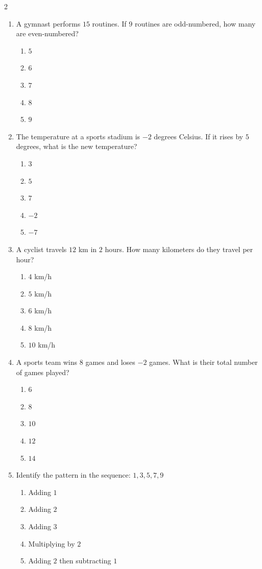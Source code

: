 \documentclass[10pt]{article}
\begin{document}
\begin{multicols}{2}
\begin{enumerate}[label=\textbf{Q\arabic*.}, leftmargin=*, itemsep=6pt, parsep=0pt]
  \item \small A gymnast performs $15$ routines. If $9$ routines are odd-numbered, how many are even-numbered?
  \begin{enumerate}[label=(\Alph*), leftmargin=0.6cm, nosep, itemsep=2pt]
    \item $5$
    \item $6$
    \item $7$
    \item $8$
    \item $9$
  \end{enumerate}

  \item \small The temperature at a sports stadium is $-2$ degrees Celsius. If it rises by $5$ degrees, what is the new temperature?
  \begin{enumerate}[label=(\Alph*), leftmargin=0.6cm, nosep, itemsep=2pt]
    \item $3$
    \item $5$
    \item $7$
    \item $-2$
    \item $-7$
  \end{enumerate}

  \item \small A cyclist travels $12$ km in $2$ hours. How many kilometers do they travel per hour?
  \begin{enumerate}[label=(\Alph*), leftmargin=0.6cm, nosep, itemsep=2pt]
    \item $4$ km/h
    \item $5$ km/h
    \item $6$ km/h
    \item $8$ km/h
    \item $10$ km/h
  \end{enumerate}

  \item \small A sports team wins $8$ games and loses $-2$ games. What is their total number of games played?
  \begin{enumerate}[label=(\Alph*), leftmargin=0.6cm, nosep, itemsep=2pt]
    \item $6$
    \item $8$
    \item $10$
    \item $12$
    \item $14$
  \end{enumerate}

  \item \small Identify the pattern in the sequence: $1, 3, 5, 7, 9$
  \begin{enumerate}[label=(\Alph*), leftmargin=0.6cm, nosep, itemsep=2pt]
    \item Adding $1$
    \item Adding $2$
    \item Adding $3$
    \item Multiplying by $2$
    \item Adding $2$ then subtracting $1$
  \end{enumerate}


\end{enumerate}
\end{multicols}
\end{document}
